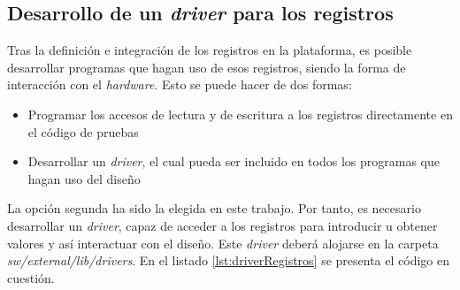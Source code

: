 \subsection{Desarrollo de un \emph{driver} para los registros}
Tras la definición e integración de los registros en la plataforma, es posible desarrollar programas que hagan uso de esos registros, siendo la forma de interacción con el \textit{hardware}. Esto se puede hacer de dos formas:

\begin{itemize}
    \item Programar los accesos de lectura y de escritura a los registros directamente en el código de pruebas
    \item Desarrollar un \textit{driver}, el cual pueda ser incluido en todos los programas que hagan uso del diseño
\end{itemize}

La opción segunda ha sido la elegida en este trabajo. Por tanto, es necesario desarrollar un \emph{driver}, capaz de acceder a los registros para introducir u obtener valores y así interactuar con el diseño. Este \emph{driver} deberá alojarse en la carpeta \emph{sw/external/lib/drivers}. En el listado \ref{lst:driverRegistros} se presenta el código en cuestión.


